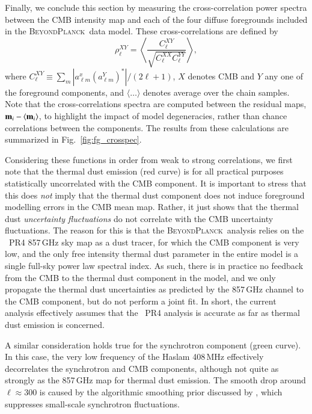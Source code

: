 \documentclass[twocolumn]{aa}
\newcommand{\BP}{\textsc{BeyondPlanck}}
\begin{document}
Finally, we conclude this section by measuring the cross-correlation
power spectra between the CMB intensity map and each of the four
diffuse foregrounds included in the \BP\ data model. These
cross-correlations are defined by
\begin{equation}
  \rho^{XY}_{\ell} = \left\langle \frac{C_{\ell}^{XY}}{\sqrt{C_{\ell}^{XX}C_{\ell}^{YY}}} \right\rangle,
\end{equation}
where $C_{\ell}^{XY}\equiv \sum_m|a_{\ell m}^x (a_{\ell m}^Y)^*|/(2\ell+1)$, $X$ denotes CMB and $Y$ any one of the foreground components, and $\langle\ldots\rangle$ denotes average over the chain samples. Note that the cross-correlations spectra are computed between the residual maps, ${\bf m}_i - \langle {\bf m}_i \rangle$, to highlight the impact of model degeneracies, rather than chance correlations between the components.  The results from these calculations are summarized in
Fig.~\ref{fig:fg_crosspec}.

Considering these functions in order from weak to strong correlations,
we first note that the thermal dust emission (red curve) is for all
practical purposes statistically uncorrelated with the CMB
component. It is important to stress that this does \emph{not} imply
that the thermal dust component does not induce foreground modelling
errors in the CMB mean map. Rather, it just shows that the
thermal dust \emph{uncertainty fluctuations} do not correlate with the
CMB uncertainty fluctuations. The reason for this is that the
\BP\ analysis \citep{bp01} relies on the \Planck\ PR4 857\,GHz sky map
as a dust tracer, for which the CMB component is very low, and the
only free intensity thermal dust parameter in the entire model is a
single full-sky power law spectral index. As such, there is in
practice no feedback from the CMB to the thermal dust component in the
model, and we only propagate the thermal dust
uncertainties as predicted by the 857\,GHz channel to the CMB
component, but do not perform a joint fit. In short, the current
analysis effectively assumes that the \Planck\ PR4 analysis is
accurate as far as thermal dust emission is concerned.

A similar consideration holds true for the synchrotron component
(green curve). In this case, the very low frequency of the Haslam
408\,MHz effectively decorrelates the synchrotron and CMB components,
although not quite as strongly as the 857\,GHz map for thermal dust
emission. The smooth drop around $\ell\approx300$ is caused by the
algorithmic smoothing prior discussed by \citet{bp13}, which
suppresses small-scale synchrotron fluctuations.
\end{document}
